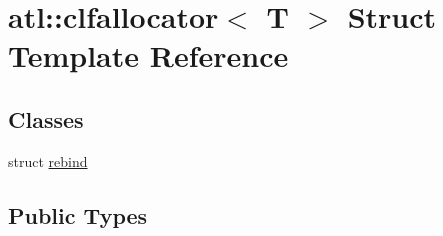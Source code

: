 \hypertarget{structatl_1_1clfallocator}{\section{atl\+:\+:clfallocator$<$ T $>$ Struct Template Reference}
\label{structatl_1_1clfallocator}
}
\subsection*{Classes}
\begin{DoxyCompactItemize}
\item 
struct \hyperlink{structatl_1_1clfallocator_1_1rebind}{rebind}
\end{DoxyCompactItemize}
\subsection*{Public Types}
